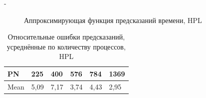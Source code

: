 \documentclass[unicode, t, 11pt]{beamer}%
\newlength{\mylen}
\begin{document}
\begin{frame}
\begin{columns}[T]
\begin{column}{\dimexpr\textwidth-\mylen}
\begin{figure}
						\caption{Аппроксимирующая функция предсказаний времени, HPL}
						\label{figure_HPL_C_3}
					\end{figure}
		 			\begin{table}
			 			\captionsetup{font=tiny, labelfont=tiny}
			 			\tiny
							\begin{tabularx}{\textwidth}{|X|X|X|X|X|X|}%
								\hline
								  PN &  225 &  400 &  576 &  784 & 1369 \\ \hline
								Mean & 5,09 & 7,17 & 3,74 & 4,43 & 2,95 \\ \hline
							\end{tabularx}
						\caption{Относительные ошибки предсказаний, усреднённые по количеству процессов, HPL}
					\end{table}
				\end{column}
	 		\end{columns}
	 	\end{frame}
\end{document}
